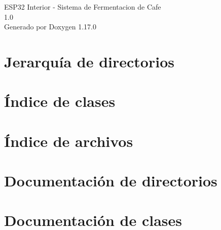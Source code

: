 \documentclass[twoside]{book}
\newcommand{\+}{\discretionary{\mbox{\scriptsize$\hookleftarrow$}}{}{}}
\newcommand{\clearemptydoublepage}{%
    \newpage{\pagestyle{empty}\cleardoublepage}%
  }
\begin{document}
  \raggedbottom
    \hypersetup{pageanchor=false,
                bookmarksnumbered=true,
                pdfencoding=unicode
               }
  \begin{titlepage}
  \vspace*{7cm}
  \begin{center}%
  {\Large ESP32 Interior -\/ Sistema de Fermentacion de Cafe}\\
  [1ex]\large 1.\+0 \\
  \vspace*{1cm}
  {\large Generado por Doxygen 1.17.0}\\
  \end{center}
  \end{titlepage}
  \clearemptydoublepage
  \tableofcontents
  \clearemptydoublepage
  \hypersetup{pageanchor=true}
\chapter{Jerarquía de directorios}

\chapter{Índice de clases}

\chapter{Índice de archivos}

\chapter{Documentación de directorios}







\chapter{Documentación de clases}




\end{document}
